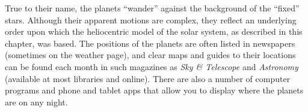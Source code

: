 \documentclass[main.tex]{subfiles}
\begin{document}
\begin{mdframed}[backgroundcolor=black!10]
    \vspace{1em}
    
    True to their name, the planets ``wander'' against the background of the ``fixed'' stars. Although their apparent motions are complex, they reflect an underlying order upon which the heliocentric model of the solar system, as described in this chapter, was based. The positions of the planets are often listed in newspapers (sometimes on the weather page), and clear maps and guides to their locations can be found each month in such magazines as \textit{Sky \& Telescope} and \textit{Astronomy} (available at most libraries and online). There are also a number of computer programs and phone and tablet apps that allow you to display where the planets are on any night.
\end{mdframed}
\end{document}
